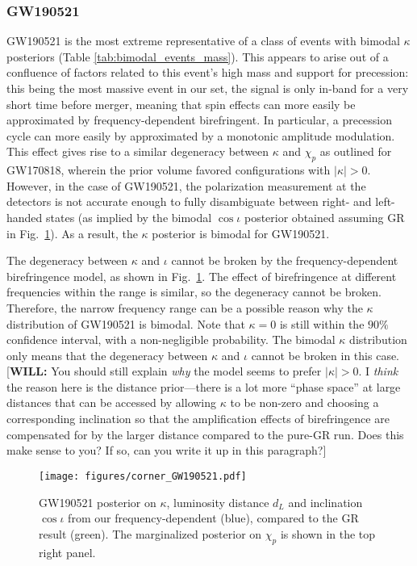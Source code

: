 \documentclass[aps,prd,twocolumn,superscriptaddress,preprintnumbers,floatfix,nofootinbib]{revtex4-2}
\newcommand*{\wf}[1]{\textsf{\color{cyan} [\textbf{WILL:} #1]}}
\begin{document}
\subsubsection{GW190521}
\label{sec:GW190521}

GW190521 is the most extreme representative of a class of events with bimodal $\kappa$ posteriors (Table \ref{tab:bimodal_events_mass}).
This appears to arise out of a confluence of factors related to this event's high mass and support for precession: this being the most massive event in our set, the signal is only in-band for a very short time before merger, meaning that spin effects can more easily be approximated by frequency-dependent birefringent.
In particular, a precession cycle can more easily by approximated by a monotonic amplitude modulation.
This effect gives rise to a similar degeneracy between $\kappa$ and $\chi_p$ as outlined for GW170818, wherein the prior volume favored configurations with $|\kappa| >0$.
However, in the case of GW190521, the polarization measurement at the detectors is not accurate enough to fully disambiguate between right- and left-handed states (as implied by the bimodal $\cos\iota$ posterior obtained assuming \ac{GR} in Fig.~\ref{fig:corner_GW190521}).
As a result, the $\kappa$ posterior is bimodal for GW190521.


The degeneracy between $\kappa$ and $\iota$ cannot be broken by the frequency-dependent birefringence model, as shown in Fig.~\ref{fig:corner_GW190521}.
The effect of birefringence at different frequencies within the range is similar, so the degeneracy cannot be broken.
Therefore, the narrow frequency range can be a possible reason why the $\kappa$ distribution of GW190521 is bimodal.
Note that $\kappa=0$ is still within the $90\%$ confidence interval, with a non-negligible probability.
The bimodal $\kappa$ distribution only means that the degeneracy between $\kappa$ and $\iota$ cannot be broken in this case.  \wf{You should still explain \emph{why} the model seems to prefer $\left| \kappa \right| > 0$.  I \emph{think} the reason here is the distance prior---there is a lot more ``phase space'' at large distances that can be accessed by allowing $\kappa$ to be non-zero and choosing a corresponding inclination so that the amplification effects of birefringence are compensated for by the larger distance compared to the pure-GR run.  Does this make sense to you?  If so, can you write it up in this paragraph?}

\begin{figure}[h]
    \texttt{[image: figures/corner\_GW190521.pdf]}
    \caption{
        GW190521 posterior on $\kappa$, luminosity distance $d_L$ and inclination $\cos\iota$ from our frequency-dependent (blue), compared to the GR result (green).
        The marginalized posterior on $\chi_p$ is shown in the top right panel.
    }
    \label{fig:corner_GW190521}
\end{figure}
\end{document}
